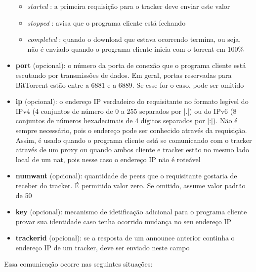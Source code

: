 \begin{itemize}
    \begin{itemize}
        \item \emph{started} : a primeira requisição para o \gls*{tracker} deve enviar
        este valor
        \item \emph{stopped} : avisa que o programa cliente está fechando
        \item \emph{completed} : quando o download que estava ocorrendo termina, ou
        seja, não é enviado quando o programa cliente inicia com o \gls*{torrent} em
        100\%
    \end{itemize}

    \item \textbf{port} (opcional): o número da porta de conexão que o programa cliente
    está escutando por transmissões de dados. Em geral, portas reservadas para
    BitTorrent estão entre a 6881 e a 6889. Se esse for o caso, pode ser omitido

    \item \textbf{ip} (opcional): o endereço IP verdadeiro do requisitante no formato
    legível do IPv4 (4 conjuntos de número de 0 a 255 separados por \bverb|.|) ou do
    IPv6 (8 conjuntos de números hexadecimais de 4 dígitos separados por \bverb|:|).
    Não é sempre necessário, pois o endereço pode ser conhecido através da requisição.
    Assim, é usado quando o programa cliente está se comunicando com o \gls*{tracker}
    através de um \gls{proxy} ou quando ambos cliente e \gls*{tracker} estão no mesmo
    lado local de um \gls{nat}, pois nesse caso o endereço IP não é roteável

    \item \textbf{numwant} (opcional): quantidade de \glspl*{peer} que o requisitante
    gostaria de receber do \gls*{tracker}. É permitido valor zero. Se omitido, assume
    valor padrão de 50

    \item \textbf{key} (opcional): mecanismo de idetificação adicional para o programa
    cliente provar sua identidade caso tenha ocorrido mudança no seu endereço IP

    \item \textbf{trackerid} (opcional): se a resposta de um \gls*{announce} anterior
    continha o endereço IP de um \gls*{tracker}, deve ser enviado neste campo
\end{itemize}

\newpage
{}

Essa comunicação ocorre nas seguintes situações:

